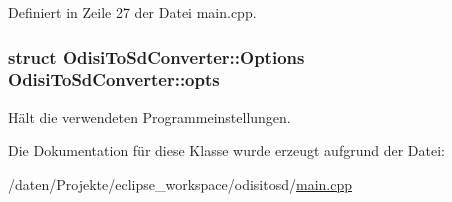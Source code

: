 Definiert in Zeile 27 der Datei main.\-cpp.

\hypertarget{classOdisiToSdConverter_a032865606668d520887b2b164913539d}{
\subsubsection[{opts}]{\setlength{\rightskip}{0pt plus 5cm}struct {\bf Odisi\-To\-Sd\-Converter\-::\-Options}  Odisi\-To\-Sd\-Converter\-::opts\hspace{0.3cm}{\ttfamily [protected]}}}\label{classOdisiToSdConverter_a032865606668d520887b2b164913539d}


Hält die verwendeten Programmeinstellungen. 



Die Dokumentation für diese Klasse wurde erzeugt aufgrund der Datei\-:\begin{DoxyCompactItemize}
\item 
/daten/\-Projekte/eclipse\-\_\-workspace/odisitosd/\hyperlink{odisitosd_2main_8cpp}{main.\-cpp}\end{DoxyCompactItemize}
